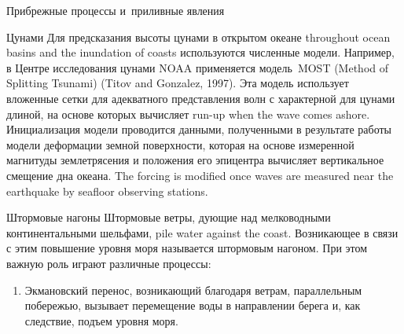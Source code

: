 \begin{chapter}{Прибрежные процессы и~приливные явления}
\begin{section}{Цунами}
Для предсказания высоты цунами в открытом океане 
throughout ocean basins and the inundation of coasts
используются численные модели. Например, в Центре исследования цунами
NOAA применяется модель~MOST (Method of Splitting Tsunami)
(Titov and Gonzalez, 1997). 
Эта модель использует вложенные сетки для адекватного представления 
волн с характерной для цунами длиной, на основе которых вычисляет
run-up when the wave comes ashore. Инициализация модели проводится данными,
полученными в результате работы модели деформации земной поверхности,
которая на основе измеренной магнитуды землетрясения и положения его 
эпицентра вычисляет вертикальное смещение дна океана.
The forcing is modified once waves are
measured near the earthquake by seafloor observing stations.
%
\end{section}

\begin{section}{Штормовые нагоны}
Штормовые ветры, дующие над мелководными
континентальными шельфами, pile water against the coast. 
Возникающее в связи с этим повышение уровня моря называется штормовым нагоном.
При этом важную роль играют различные процессы:
%
%
\begin{enumerate}
\item 
Экмановский перенос, возникающий благодаря
ветрам, параллельным побережью, вызывает перемещение воды в направлении
берега и, как следствие, подъем уровня моря.
%


\end{enumerate}
\end{section}
\end{chapter}
